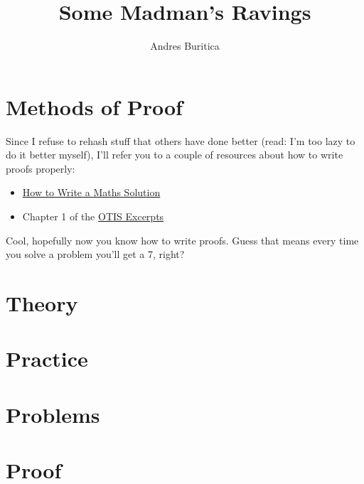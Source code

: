 \documentclass{book}
\title{Some Madman's Ravings}
\author{Andres Buritica}
\begin{document}
\maketitle
\tableofcontents
\part{Methods of Proof}
Since I refuse to rehash stuff that others have done better (read: I'm too
lazy to do it better myself), I'll refer you to a couple of resources about how
to write proofs properly:
\begin{itemize}
  \item
    \href{https://artofproblemsolving.com/news/articles/how-to-write-a-solution}
    {How to Write a Maths Solution}
  \item Chapter 1 of the
    \href{https://web.evanchen.cc/textbooks/OTIS-Excerpts.pdf}{OTIS Excerpts}
\end{itemize}

Cool, hopefully now you know how to write proofs. Guess that means every time
you solve a problem you'll get a 7, right?
\part{Theory}
\part{Practice}
\part{Problems}
\part{Proof}
\end{document}
